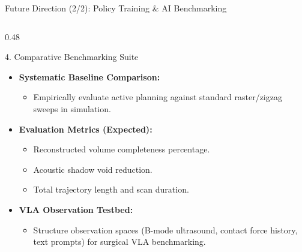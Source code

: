 \documentclass[aspectratio=169, 10pt]{beamer}
\begin{document}
\begin{frame}{Future Direction (2/2): Policy Training \& AI Benchmarking}
\begin{columns}[T]
        \begin{column}{0.48\textwidth}
            \begin{block}{4. Comparative Benchmarking Suite}
                \begin{itemize}\itemsep=3pt
                    \item \textbf{Systematic Baseline Comparison:}
                    \begin{itemize}\itemsep=1pt
                        \item Empirically evaluate active planning against standard raster/zigzag sweeps in simulation.
                    \end{itemize}
                    \item \textbf{Evaluation Metrics (Expected):}
                    \begin{itemize}\itemsep=1pt
                        \item Reconstructed volume completeness percentage.
                        \item Acoustic shadow void reduction.
                        \item Total trajectory length and scan duration.
                    \end{itemize}
                    \item \textbf{VLA Observation Testbed:}
                    \begin{itemize}\itemsep=1pt
                        \item Structure observation spaces (B-mode ultrasound, contact force history, text prompts) for surgical VLA benchmarking.
                    \end{itemize}
                \end{itemize}
            \end{block}
        \end{column}
    \end{columns}
\end{frame}
\end{document}
